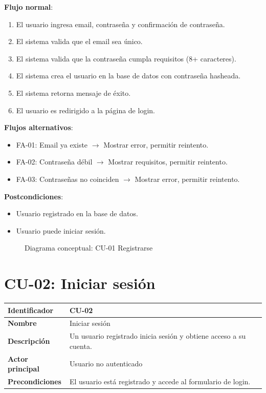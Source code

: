 \documentclass[12pt,a4paper]{article}
\begin{document}
\vspace{0.5em}

\textbf{Flujo normal}:
\begin{enumerate}[leftmargin=*]
    \item El usuario ingresa email, contrase\~na y confirmaci\'on de contrase\~na.
    \item El sistema valida que el email sea \'unico.
    \item El sistema valida que la contrase\~na cumpla requisitos (8+ caracteres).
    \item El sistema crea el usuario en la base de datos con contrase\~na hasheada.
    \item El sistema retorna mensaje de \'exito.
    \item El usuario es redirigido a la p\'agina de login.
\end{enumerate}

\textbf{Flujos alternativos}:
\begin{itemize}[leftmargin=*]
    \item FA-01: Email ya existe $\rightarrow$ Mostrar error, permitir reintento.
    \item FA-02: Contrase\~na d\'ebil $\rightarrow$ Mostrar requisitos, permitir reintento.
    \item FA-03: Contrase\~nas no coinciden $\rightarrow$ Mostrar error, permitir reintento.
\end{itemize}

\textbf{Postcondiciones}:
\begin{itemize}[leftmargin=*]
    \item Usuario registrado en la base de datos.
    \item Usuario puede iniciar sesi\'on.
\end{itemize}

\begin{figure}[h]
\centering
{}
\caption{Diagrama conceptual: CU-01 Registrarse}
\end{figure}

\newpage

\section{CU-02: Iniciar sesi\'on}

\begin{tabular}{|p{3.5cm}|p{10cm}|}
\hline
\textbf{Identificador} & CU-02 \\
\hline
\textbf{Nombre} & Iniciar sesi\'on \\
\hline
\textbf{Descripci\'on} & Un usuario registrado inicia sesi\'on y obtiene acceso a su cuenta. \\
\hline
\textbf{Actor principal} & Usuario no autenticado \\
\hline
\textbf{Precondiciones} & El usuario est\'a registrado y accede al formulario de login. \\
\hline
\end{tabular}
\end{document}
